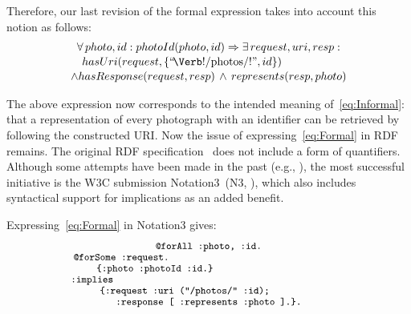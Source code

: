 \documentclass[smallextended]{svjour3}
\begin{document}
{Therefore, our last revision of the formal expression takes into account this notion as follows:
\begin{multline}\label{eq:Formal}
    \makebox[7.8cm]{$\forall\, photo, id : photoId(photo, id) \Rightarrow
                    \exists\, request, uri, resp :$}\\[-.2em]
    \shoveleft{hasUri(request, \{\mbox{``\!\Verb!/photos/!''}, id\})} \\[-.2em]
    \land hasResponse(request, resp) \, \land \, represents(resp, photo)
\end{multline}

The above expression now corresponds to the intended meaning of~\ref{eq:Informal}: that a representation of every photograph with an identifier can be retrieved by following the constructed URI. Now the issue of expressing~\ref{eq:Formal} in RDF remains. The original RDF specification~\cite{RDF} does not include a form of quantifiers. Although some attempts have been made in the past (e.g., \cite{RDFQuantifiers}), the most successful initiative is the W3C submission Notation3~(N3, \cite{Notation3}), which also includes syntactical support for implications as an added benefit.

Expressing~\ref{eq:Formal} in Notation3 gives:
\begin{multline}\label{eq:FullNotation3}
    \makebox[6.0cm]{\fontsize{9}{11}\texttt{@forAll :photo, :id.}}\\[-.5em]
    \fontsize{9}{11}\texttt{@forSome :request.}\makebox[5.47cm]{}\\[-.5em]
    \fontsize{9}{11}\texttt{\{:photo :photoId :id.\}}\makebox[3.37cm]{}\\[-.5em]
    \fontsize{9}{11}\texttt{:implies}\makebox[7.3cm]{}\\[-.5em]
    \fontsize{9}{11}\texttt{\{:request :uri ("/photos/" :id);}\makebox[1.5cm]{}\\[-.5em]
    \makebox[7.5cm]{\fontsize{9}{11}\texttt{:response [ :represents :photo ].\}.}}
\end{multline}

}
\end{document}
